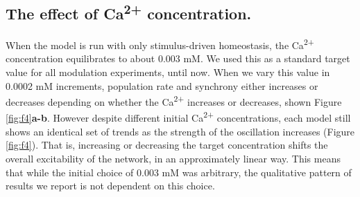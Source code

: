 \documentclass{article}
\begin{document}
\subsection*{The effect of Ca\textsuperscript{2+} concentration.}
When the model is run with only stimulus-driven homeostasis, the Ca\textsuperscript{2+} concentration equilibrates to about 0.003 mM. We used this as a standard target value for all modulation experiments, until now. When we vary this value in 0.0002 mM increments, population rate and synchrony either increases or decreases depending on whether the Ca\textsuperscript{2+} increases or decreases, shown Figure \ref{fig:f4}\textbf{a-b}. However despite different initial Ca\textsuperscript{2+} concentrations, each model still shows an identical set of trends as the strength of the oscillation increases (Figure \ref{fig:f4}). That is, increasing or decreasing the target concentration shifts the overall excitability of the network, in an approximately linear way. This means that while the initial choice of 0.003 mM was arbitrary, the qualitative pattern of results we report is not dependent on this choice.
\end{document}
